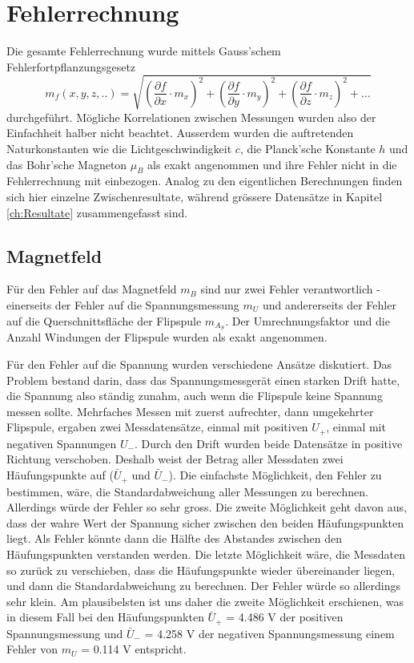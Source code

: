 \documentclass[a4paper,parskip,11pt, DIV12]{scrreprt}
\begin{document}
	 
	\chapter{Fehlerrechnung}
	\label{ch:Fehlerrechnung}
	Die gesamte Fehlerrechnung wurde mittels Gauss'schem Fehlerfortpflanzungsgesetz 
	\begin{equation}
	\label{Fehlerfortpflanzungsgesetz}
	m_{f}(x,y,z,..) = \sqrt{(\frac{\partial f}{\partial x} \cdot m_x)^2+(\frac{\partial f}{\partial y} \cdot m_y)^2+(\frac{\partial f}{\partial z} \cdot m_z)^2+...}
	\end{equation}
	durchgeführt. Mögliche Korrelationen zwischen Messungen wurden also der Einfachheit halber nicht beachtet. Ausserdem wurden die auftretenden Naturkonstanten wie die Lichtgeschwindigkeit $c$, die Planck'sche Konstante $h$ und das Bohr'sche Magneton $\mu_B$ als exakt angenommen und ihre Fehler nicht in die Fehlerrechnung mit einbezogen. Analog zu den eigentlichen Berechnungen finden sich hier einzelne Zwischenresultate, während grössere Datensätze in Kapitel \ref{ch:Resultate} zusammengefasst sind.
	
	\section{Magnetfeld}
	\label{sec:Magnetfehler}
	Für den Fehler auf das Magnetfeld $m_B$ sind nur zwei Fehler verantwortlich - einerseits der Fehler auf die Spannungsmessung $m_U$ und andererseits der Fehler auf die Querschnittsfläche der Flipspule $m_{A_S}$. Der Umrechnungsfaktor und die Anzahl Windungen der Flipspule wurden als exakt angenommen. 
	
	Für den Fehler auf die Spannung wurden verschiedene Ansätze diskutiert. Das Problem bestand darin, dass das Spannungsmessgerät einen starken Drift hatte, die Spannung also ständig zunahm, auch wenn die Flipspule keine Spannung messen sollte. Mehrfaches Messen mit zuerst aufrechter, dann umgekehrter Flipspule, ergaben zwei Messdatensätze, einmal mit positiven $U_+$, einmal mit negativen Spannungen $U_-$. Durch den Drift wurden beide Datensätze in positive Richtung verschoben. Deshalb weist der Betrag aller Messdaten zwei Häufungspunkte auf ($\bar{U}_+$ und $\bar{U}_-$). Die einfachste Möglichkeit, den Fehler zu bestimmen, wäre, die Standardabweichung aller Messungen zu berechnen. Allerdings würde der Fehler so sehr gross. Die zweite Möglichkeit geht davon aus, dass der wahre Wert der Spannung sicher zwischen den beiden Häufungspunkten liegt. Als Fehler könnte dann die Hälfte des Abstandes zwischen den Häufungspunkten verstanden werden. Die letzte Möglichkeit wäre, die Messdaten so zurück zu verschieben, dass die Häufungspunkte wieder übereinander liegen, und dann die Standardabweichung zu berechnen. Der Fehler würde so allerdings sehr klein. Am plausibelsten ist uns daher die zweite Möglichkeit erschienen, was in diesem Fall bei den Häufungspunkten $\bar{U}_+$ = 4.486 V der positiven Spannungsmessung und $\bar{U}_-$ = 4.258 V der negativen Spannungsmessung einem Fehler von $m_U$ = 0.114 V entspricht.
	
\end{document}
